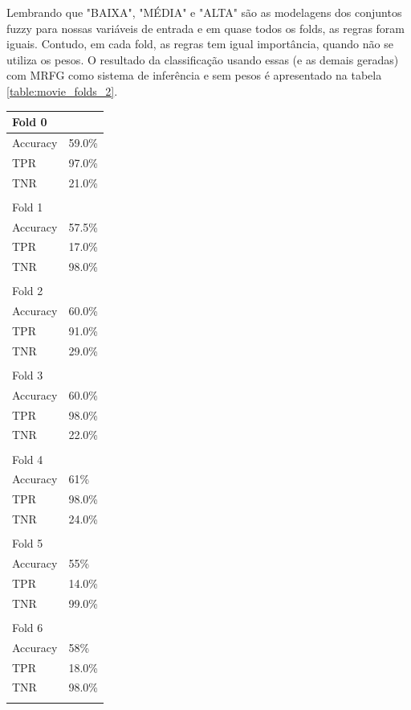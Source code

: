 \documentclass[template.tex]{subfiles}
\begin{document}
Lembrando que "BAIXA", "MÉDIA" e "ALTA" são as modelagens dos conjuntos fuzzy para nossas variáveis de entrada e em quase todos os folds, as regras foram iguais. Contudo, em cada fold, as regras tem igual importância, quando não se utiliza os pesos. O resultado da classificação usando essas (e as demais geradas) com MRFG como sistema de inferência e sem pesos é apresentado na tabela \ref{table:movie_folds_2}.

\begin{table}[H]
	\centering
    \begin{tabular}{ll}
    Fold 0 \\ \hline
    Accuracy &  59.0\% \\
	TPR &  97.0\% \\
	TNR &  21.0\% \\ \\
	
	Fold 1 \\ \hline
    Accuracy &  57.5\% \\
	TPR &  17.0\% \\
	TNR &  98.0\% \\ \\
	
	Fold 2 \\ \hline
    Accuracy &  60.0\% \\
	TPR &  91.0\% \\
	TNR &  29.0\% \\ \\
	
	Fold 3 \\ \hline
    Accuracy &  60.0\% \\
	TPR &  98.0\% \\
	TNR &  22.0\% \\ \\
	
	Fold 4 \\ \hline
    Accuracy &  61\% \\
	TPR &  98.0\% \\
	TNR &  24.0\% \\ \\
	
	Fold 5 \\ \hline
    Accuracy &  55\% \\
	TPR & 14.0\% \\
	TNR &  99.0\% \\ \\
	
	Fold 6 \\ \hline
    Accuracy &  58\% \\
	TPR &  18.0\% \\
	TNR &  98.0\% \\ \\
	

\end{tabular}
\end{table}
\end{document}
